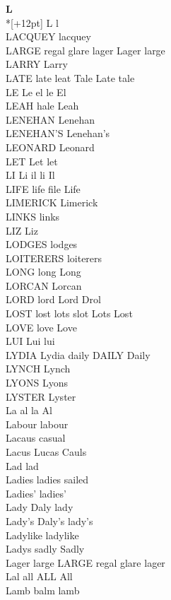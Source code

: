\vspace{14pt}
\noindent\textbf{\Large L}\\*[+12pt]
L l\\
LACQUEY lacquey\\
LARGE regal glare lager Lager large\\
LARRY Larry\\
LATE late leat Tale Late tale\\
LE Le el le El\\
LEAH hale Leah\\
LENEHAN Lenehan\\
LENEHAN'S Lenehan's\\
LEONARD Leonard\\
LET Let let\\
LI Li il li Il\\
LIFE life file Life\\
LIMERICK Limerick\\
LINKS links\\
LIZ Liz\\
LODGES lodges\\
LOITERERS loiterers\\
LONG long Long\\
LORCAN Lorcan\\
LORD lord Lord Drol\\
LOST lost lots slot Lots Lost\\
LOVE love Love\\
LUI Lui lui\\
LYDIA Lydia daily DAILY Daily\\
LYNCH Lynch\\
LYONS Lyons\\
LYSTER Lyster\\
La al la Al\\
Labour labour\\
Lacaus casual\\
Lacus Lucas Cauls\\
Lad lad\\
Ladies ladies sailed\\
Ladies' ladies'\\
Lady Daly lady\\
Lady's Daly's lady's\\
Ladylike ladylike\\
Ladys sadly Sadly\\
Lager large LARGE regal glare lager\\
Lal all ALL All\\
Lamb balm lamb\\
